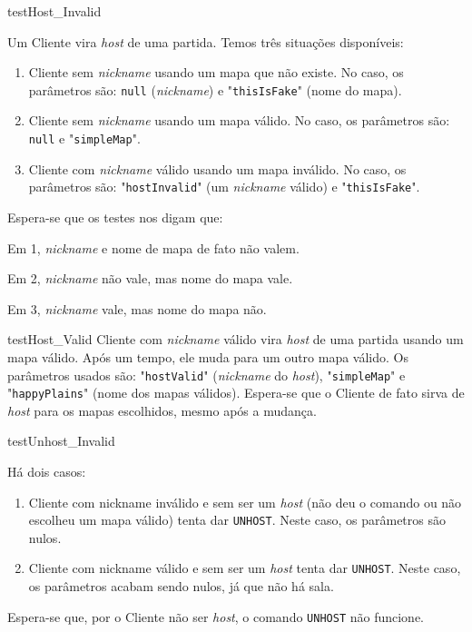 \begin{itemise}
\teste
    {testHost\_Invalid}
    {Um Cliente vira \emph{host} de uma partida. Temos três situações disponíveis:
        \begin{enumerate}
            \item Cliente sem \emph{nickname} usando um mapa que não existe. No caso,
                os parâmetros são: \texttt{null} (\emph{nickname}) e
            "\texttt{thisIsFake}" (nome do mapa).
            \item Cliente sem \emph{nickname} usando um mapa válido. No caso, os
                parâmetros são: \texttt{null} e "\texttt{simpleMap}".
            \item Cliente com \emph{nickname} válido usando um mapa inválido. No
                caso, os parâmetros são: "\texttt{hostInvalid}" (um \emph{nickname}
                válido) e "\texttt{thisIsFake}".
        \end{enumerate}
    }
    {Espera-se que os testes nos digam que:
        \begin{itemise}
            \item Em 1, \emph{nickname} e nome de mapa de fato não valem.
            \item Em 2, \emph{nickname} não vale, mas nome do mapa vale.
            \item Em 3, \emph{nickname} vale, mas nome do mapa não.
        \end{itemise}
    }
    
\teste
    {testHost\_Valid}
    {Cliente com \emph{nickname} válido vira \emph{host} de uma partida usando um
    mapa válido. Após um tempo, ele muda para um outro mapa válido. Os parâmetros
    usados são: "\texttt{hostValid}" (\emph{nickname} do \emph{host}),
    "\texttt{simpleMap}" e "\texttt{happyPlains}" (nome dos mapas válidos).}
    {Espera-se que o Cliente de fato sirva de \emph{host} para os mapas escolhidos,
    mesmo após a mudança.}

\teste
    {testUnhost\_Invalid}
    {Há dois casos:
        \begin{enumerate}
            \item Cliente com nickname inválido e sem ser um \emph{host} (não deu o
            comando ou não escolheu um mapa válido) tenta dar \texttt{UNHOST}.
            Neste caso, os parâmetros são nulos.
            \item Cliente com nickname válido e sem ser um \emph{host} tenta dar
            \texttt{UNHOST}. Neste caso, os parâmetros acabam sendo nulos, já que
            não há sala.
        \end{enumerate}
    }
    {Espera-se que, por o Cliente não ser \emph{host}, o comando \texttt{UNHOST} não
    funcione.}


\end{itemise}
